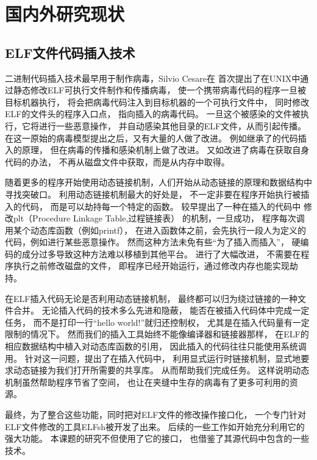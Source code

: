 \section{国内外研究现状}

\subsection{ELF文件代码插入技术}

二进制代码插入技术最早用于制作病毒，Silvio Cesare在\cite{silvio}
首次提出了在UNIX中通过静态修改ELF可执行文件制作和传播病毒，
使一个携带病毒代码的程序一旦被目标机器执行，
将会把病毒代码注入到目标机器的一个可执行文件中，
同时修改ELF的文件头的程序入口点，
指向插入的病毒代码。
一旦这个被感染的文件被执行，它将进行一些恶意操作，
并自动感染其他目录的ELF文件，从而引起传播。
在这一原始的病毒模型提出之后，又有大量的人做了改进。
例如\cite{simple}继承了\cite{silvio}的代码插入的原理，
但在病毒的传播和感染机制上做了改进。
又如\cite{prototype}改进了病毒在获取自身代码的办法，
不再从磁盘文件中获取，而是从内存中取得。


随着更多的程序开始使用动态链接机制，人们开始从动态链接的原理和数据结构中
寻找突破口。
利用动态链接机制最大的好处是，
不一定非要在程序开始执行被插入的代码，
而是可以劫持每一个特定的函数。
\cite{sharelib}较早提出了一种在插入的代码中
修改plt（Procedure Linkage Table,过程链接表）
的机制，一旦成功，
程序每次调用某个动态库函数（例如printf），
在进入函数体之前，会先执行一段人为定义的代码，例如进行某些恶意操作。
然而这种方法未免有些“为了插入而插入”，
硬编码的成分过多导致这种方法难以移植到其他平台。
\cite{modern}进行了大幅改进，
不需要在程序执行之前修改磁盘的文件，
即程序已经开始运行，通过修改内存也能实现劫持。

在ELF插入代码无论是否利用动态链接机制，
最终都可以归为绕过链接的一种文件合并。
无论插入代码的技术多么先进和隐蔽，
能否在被插入代码体中完成一定任务，
而不是打印一行“hello world!”就归还控制权，
尤其是在插入代码量有一定限制的情况下。
然而我们的插入工具始终不能像编译器和链接器那样，
在ELF的相应数据结构中植入对动态库函数的引用，
因此插入的代码往往只能使用系统调用。
针对这一问题，\cite{subversive}提出了在插入代码中，
利用显式运行时链接机制，显式地要求动态链接为我们打开所需要的共享库。
从而帮助我们完成任务。
这样说明动态机制虽然帮助程序节省了空间，
也让在夹缝中生存的病毒有了更多可利用的资源。


最终，为了整合这些功能，同时把对ELF文件的修改操作接口化，
一个专门针对ELF文件修改的工具ELFsh被开发了出来。
后续的一些工作如\cite{cerberus}开始充分利用它的强大功能。
本课题的研究不但使用了它的接口，
也借鉴了其源代码中包含的一些技术。


